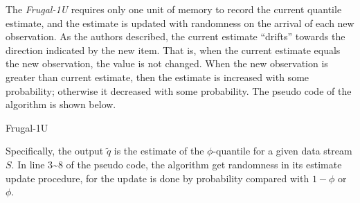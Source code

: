 The \textit{Frugal-1U} requires only one unit of memory to record the current quantile estimate, and the estimate is updated with randomness on the arrival of each new observation. As the authors described, the current estimate ``drifts'' towards the direction indicated by the new item\cite{maFrugalStreamingEstimating2014}. That is, when the current estimate equals the new observation, the value is not changed. When the new observation is greater than current estimate, then the estimate is increased with some probability; otherwise it decreased with some probability.
The pseudo code of the algorithm is shown below.

\begin{algorithm}
    \caption{Frugal-1U}\label{alg:frugal_1U}
        \begin{algorithmic}[1]
                    \EndIf
                \EndFor
        \end{algorithmic}
    \end{algorithm}
Specifically, the output $\tilde{q}$ is the estimate of the $\phi$-quantile for a given data stream $S$.
In line 3\textasciitilde 8 of the pseudo code, the algorithm get randomness in its estimate update procedure, for the update is done by probability compared with $1- \phi$ or $\phi$.
